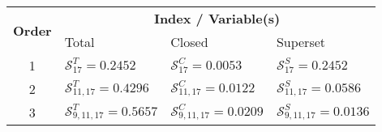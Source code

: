 
\begin{tabular}{|c|lll|}
   \hline
   \multicolumn{1}{|c|}{\multirow{2}{*}{\textbf{Order}}} & \multicolumn{3}{c|}{\textbf{Index / Variable(s)}} \\ \cline{2-4}
   \multicolumn{1}{|c|}{} & Total & Closed & Superset \\
   \hline \hline
    1 & $\mathcal{S}^T_{ 17 } = 0.2452$ & $\mathcal{S}^C_{ 17 }= 0.0053$ & $\mathcal{S}^S_{ 17 } = 0.2452$ \\ \hline

    2 & $\mathcal{S}^T_{ 11,17 } = 0.4296$ & $\mathcal{S}^C_{ 11,17 }= 0.0122$ & $\mathcal{S}^S_{ 11,17 } = 0.0586$ \\ \hline

    3 & $\mathcal{S}^T_{ 9,11,17 } = 0.5657$ & $\mathcal{S}^C_{ 9,11,17 }= 0.0209$ & $\mathcal{S}^S_{ 9,11,17 } = 0.0136$ \\  \hline
    \end{tabular}